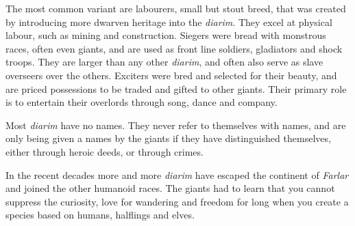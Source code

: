 The most common variant are labourers, small but stout breed, that was created
by introducing more dwarven heritage into the \emph{diarim}. They excel at
physical labour, such as mining and construction. Siegers were bread with
monstrous races, often even giants, and are used as front line soldiers,
gladiators and shock troops. They are larger than any other \emph{diarim}, and
often also serve as slave overseers over the others. Exciters were bred and
selected for their beauty, and are priced possessions to be traded and gifted
to other giants. Their primary role is to entertain their overlords through
song, dance and company.

Most \emph{diarim} have no names. They never refer to themselves with names,
and are only being given a names by the giants if they have distinguished
themselves, either through heroic deeds, or through crimes.

In the recent decades more and more \emph{diarim} have escaped the continent
of \emph{Farlar} and joined the other humanoid races. The giants had to learn
that you cannot suppress the curiosity, love for wandering and freedom for long
when you create a species based on humans, halflings and elves.

